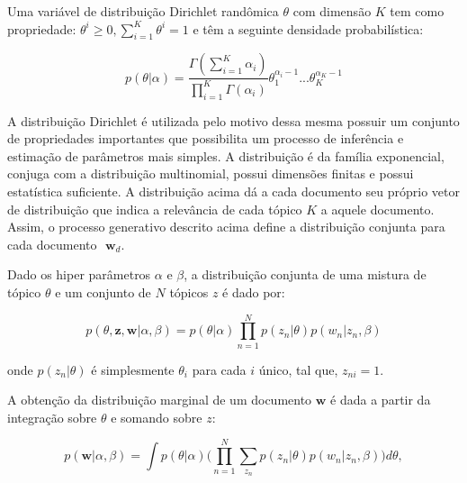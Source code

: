 \documentclass[12pt,a4paper]{article}
\begin{document}

Uma variável de distribuição Dirichlet randômica $\theta$ com dimensão $K$ tem como propriedade: $\theta ^i \geq 0, \displaystyle\sum_{i=1}^{K} \theta ^i = 1$ e têm a seguinte densidade probabilística:

\begin{equation}
p(\theta|\alpha) = \frac{\Gamma(\displaystyle\sum_{i=1}^{K} \alpha _i)}{\displaystyle\prod_{i=1}^{K} \Gamma(\alpha _i)} \theta _1 ^{\alpha _i - 1} ...  \theta _K ^{\alpha _K - 1}
\end{equation}

A distribuição Dirichlet é utilizada pelo motivo dessa mesma possuir um conjunto de propriedades importantes que possibilita um processo de inferência e estimação de parâmetros mais simples.
 A distribuição é da família exponencial, conjuga com a distribuição multinomial, possui dimensões finitas e possui estatística suficiente.
 A distribuição  acima dá a cada documento seu próprio vetor de distribuição que indica a relevância de cada tópico $K$ a aquele documento.
 Assim, o processo generativo descrito acima define a distribuição conjunta para cada documento $\textbf{ w}_d$.

Dado os hiper parâmetros $\alpha$ e $\beta$, a distribuição conjunta de uma mistura de tópico $\theta$ e um conjunto de $N$ tópicos $z$ é dado por:

\begin{equation}
p(\theta,\textbf{z},\textbf{w}|\alpha,\beta) = p(\theta|\alpha) \prod_{n=1}^{N} p(z_n|\theta)p(w_n|z_n,\beta)
\end{equation}

onde $p(z_n | \theta)$ é simplesmente $\theta _i$ para cada $i$ único,
 tal que, $z_{ni}=1$.
 
A obtenção da distribuição marginal de um documento $\textbf{w}$ é dada a partir da integração sobre $\theta$ e somando sobre $z$:

\begin{equation}
p(\textbf{w}|\alpha,\beta)=\int{p(\theta|\alpha)\Bigg(\prod_{n=1}^{N}\sum_{z_n} p(z_n|\theta)p(w_n|z_n,\beta)\Bigg)d\theta},
\end{equation}
\end{document}
